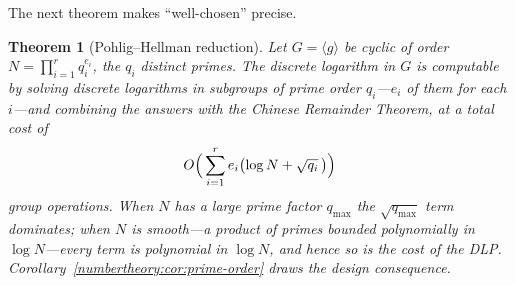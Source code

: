 \documentclass[11pt,a4paper]{article}
\newtheorem{theorem}{Theorem}[section]
\theoremstyle{definition}
\theoremstyle{remark}
\begin{document}
The next theorem makes ``well-chosen'' precise.

\begin{theorem}[Pohlig--Hellman reduction]
\label{numbertheory:thm:pohlig-hellman}
Let \(G = \langle g \rangle\) be cyclic of order
\(N = \prod_{i=1}^{r} q_i^{e_i}\), the \(q_i\) distinct primes. The
discrete logarithm in \(G\) is computable by solving discrete
logarithms in subgroups of prime order \(q_i\)---\(e_i\) of them for
each \(i\)---and combining the answers with the Chinese Remainder
Theorem, at a total cost of
\[
O\Bigl(\,\sum_{i=1}^{r} e_i \bigl(\log N + \sqrt{q_i}\,\bigr)\Bigr)
\]
group operations. When \(N\) has a large prime factor \(q_{\max}\) the
\(\sqrt{q_{\max}}\) term dominates; when \(N\) is \emph{smooth}---a
product of primes bounded polynomially in \(\log N\)---every term is
polynomial in \(\log N\), and hence so is the cost of the DLP.
Corollary~\ref{numbertheory:cor:prime-order} draws the design
consequence.
\end{theorem}
\end{document}
